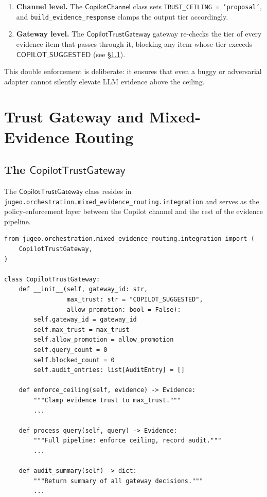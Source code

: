 \documentclass[11pt]{article}
\newcommand{\CopCh}{\mathsf{CopilotChannel}}
\newcommand{\CopGate}{\mathsf{CopilotTrustGateway}}
\newcommand{\TrustCeil}{\mathsf{COPILOT\_SUGGESTED}}
\newcommand{\buildResp}{\texttt{build\_evidence\_response}}
\begin{document}
\begin{enumerate}
\item \textbf{Channel level.}
  The $\CopCh$ class sets \texttt{TRUST\_CEILING = 'proposal'},
  and \buildResp{} clamps the output tier accordingly.

\item \textbf{Gateway level.}
  The $\CopGate$ gateway re-checks the tier of every evidence
  item that passes through it, blocking any item whose tier
  exceeds $\TrustCeil$ (see \S\ref{sec:gateway:gateway}).
\end{enumerate}

This double enforcement is deliberate: it ensures that even a
buggy or adversarial adapter cannot silently elevate LLM evidence
above the ceiling.

\section{Trust Gateway and Mixed-Evidence Routing}
\label{sec:gateway}

\subsection{The \texorpdfstring{$\CopGate$}{CopilotTrustGateway}}
\label{sec:gateway:gateway}

The $\CopGate$ class resides in
\texttt{jugeo.orchestration.mixed\_evidence\_routing.integration}
and serves as the policy-enforcement layer between the Copilot
channel and the rest of the evidence pipeline.

\begin{lstlisting}[style=jugeo-python,caption={The \texttt{CopilotTrustGateway} class (simplified).},label=lst:gateway]
from jugeo.orchestration.mixed_evidence_routing.integration import (
    CopilotTrustGateway,
)

class CopilotTrustGateway:
    def __init__(self, gateway_id: str,
                 max_trust: str = "COPILOT_SUGGESTED",
                 allow_promotion: bool = False):
        self.gateway_id = gateway_id
        self.max_trust = max_trust
        self.allow_promotion = allow_promotion
        self.query_count = 0
        self.blocked_count = 0
        self.audit_entries: list[AuditEntry] = []

    def enforce_ceiling(self, evidence) -> Evidence:
        """Clamp evidence trust to max_trust."""
        ...

    def process_query(self, query) -> Evidence:
        """Full pipeline: enforce ceiling, record audit."""
        ...

    def audit_summary(self) -> dict:
        """Return summary of all gateway decisions."""
        ...
\end{lstlisting}
\end{document}
